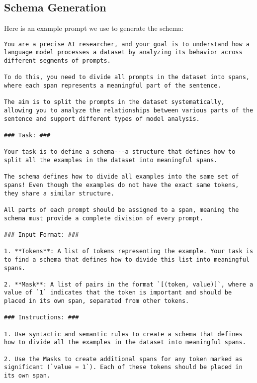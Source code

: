 \subsection{Schema Generation}
 
\lstset{
    basicstyle=\ttfamily\footnotesize, %
    breaklines=true,                  %
    frame=single                      %
}
Here is an example prompt we use to generate the schema:

\begin{lstlisting}
You are a precise AI researcher, and your goal is to understand how a language model processes a dataset by analyzing its behavior across different segments of prompts.  

To do this, you need to divide all prompts in the dataset into spans, where each span represents a meaningful part of the sentence.  

The aim is to split the prompts in the dataset systematically, allowing you to analyze the relationships between various parts of the sentence and support different types of model analysis.  

### Task: ###  

Your task is to define a schema---a structure that defines how to split all the examples in the dataset into meaningful spans.  

The schema defines how to divide all examples into the same set of spans! Even though the examples do not have the exact same tokens, they share a similar structure.  

All parts of each prompt should be assigned to a span, meaning the schema must provide a complete division of every prompt.  

### Input Format: ###  

1. **Tokens**: A list of tokens representing the example. Your task is to find a schema that defines how to divide this list into meaningful spans.  

2. **Mask**: A list of pairs in the format `[(token, value)]`, where a value of `1` indicates that the token is important and should be placed in its own span, separated from other tokens.  

### Instructions: ###  

1. Use syntactic and semantic rules to create a schema that defines how to divide all the examples in the dataset into meaningful spans.  

2. Use the Masks to create additional spans for any token marked as significant (`value = 1`). Each of these tokens should be placed in its own span.  


\end{lstlisting}
